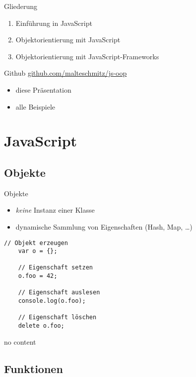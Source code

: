 \begin{frame}{Gliederung}
  \begin{enumerate}[{Teil} I]
    \item Einführung in JavaScript
    \item Objektorientierung mit JavaScript
    \item Objektorientierung mit JavaScript-Frameworks
  \end{enumerate}
\end{frame}

\begin{frame}{Github}
  \url{github.com/malteschmitz/js-oop}
  \begin{itemize}
    \item diese Präsentation
    \item alle Beispiele
  \end{itemize}
\end{frame}

\section{JavaScript}

\subsection{Objekte}

\begin{frame}[fragile]{Objekte}
  \begin{itemize}
    \item \emph{keine} Instanz einer Klasse
    \item dynamische Sammlung von Eigenschaften (Hash, Map, \ldots)
  \end{itemize}
    
  \begin{lstlisting}[gobble=4]
    // Objekt erzeugen
    var o = {};
    
    // Eigenschaft setzen
    o.foo = 42;
    
    // Eigenschaft auslesen
    console.log(o.foo);
    
    // Eigenschaft löschen
    delete o.foo;
  \end{lstlisting}  
\end{frame}

\begin{frame}
  no content
\end{frame}

\subsection{Funktionen}

